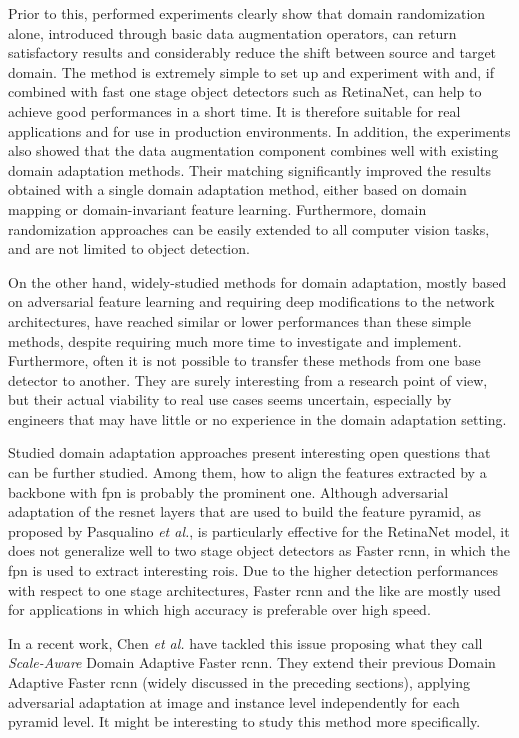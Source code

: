 \documentclass[%
    corpo=12pt,
    twoside,
    stile=classica,   
    tipotesi=magistrale,
    evenboxes,
    english,
	numerazioneromana,
]{toptesi}
\begin{document}
Prior to this, performed experiments clearly show that domain randomization alone, introduced through basic data augmentation operators, can return satisfactory results and considerably reduce the shift between source and target domain. The method is extremely simple to set up and experiment with and, if combined with fast one stage object detectors such as RetinaNet, can help to achieve good performances in a short time. It is therefore suitable for real applications and for use in production environments. In addition, the experiments also showed that the data augmentation component combines well with existing domain adaptation methods. Their matching significantly improved the results obtained with a single domain adaptation method, either based on domain mapping or domain-invariant feature learning. Furthermore, domain randomization approaches can be easily extended to all computer vision tasks, and are not limited to object detection.

On the other hand, widely-studied methods for domain adaptation, mostly based on adversarial feature learning and requiring deep modifications to the network architectures, have reached similar or lower performances than these simple methods, despite requiring much more time to investigate and implement. Furthermore, often it is not possible to transfer these methods from one base detector to another. They are surely interesting from a research point of view, but their actual viability to real use cases seems uncertain, especially by engineers that may have little or no experience in the domain adaptation setting.

\bigskip
Studied domain adaptation approaches present interesting open questions that can be further studied. Among them, how to align the features extracted by a backbone with \gls{fpn} is probably the prominent one. Although adversarial adaptation of the \gls{resnet} layers that are used to build the feature pyramid, as proposed by Pasqualino \textit{et al.}\cite{pasqualino2020unsupervised}, is particularly effective for the RetinaNet model, it does not generalize well to two stage object detectors as Faster \gls{rcnn}, in which the \gls{fpn} is used to extract interesting \glspl{roi}. Due to the higher detection performances with respect to one stage architectures, Faster \gls{rcnn} and the like are mostly used for applications in which high accuracy is preferable over high speed.

In a recent work, Chen \textit{et al.} have tackled this issue proposing what they call \textit{Scale-Aware} Domain Adaptive Faster \gls{rcnn}\cite{chen2021scale}. They extend their previous Domain Adaptive Faster \gls{rcnn} (widely discussed in the preceding sections), applying adversarial adaptation at image and instance level independently for each pyramid level. It might be interesting to study this method more specifically.
\end{document}

